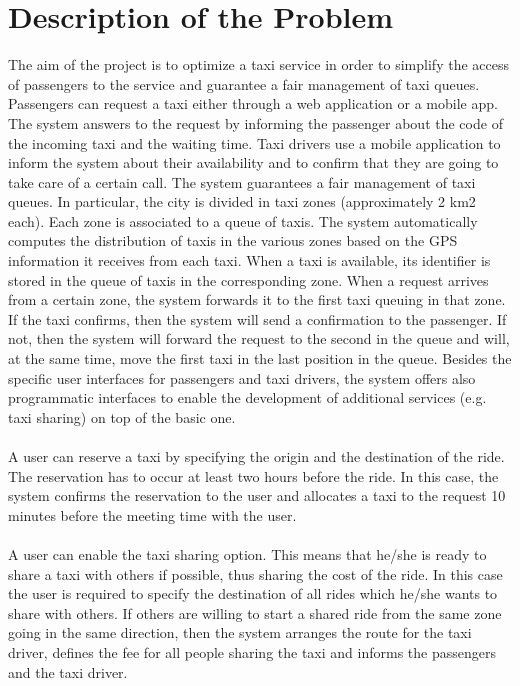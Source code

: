 \section{Description of the Problem}
The aim of the project is to optimize a taxi service in order to simplify the access of passengers to the service and guarantee a fair management of taxi queues. Passengers can request a taxi either through a web application or a mobile app. The system answers to the request by informing the passenger about the code of the incoming taxi and the waiting time. Taxi drivers use a mobile application to inform the system about their availability and to confirm that they are going to take care of a certain call. The system guarantees a fair management of taxi queues. In particular, the city is divided in taxi zones (approximately 2 km2 each). Each zone is associated to a queue of taxis. The system automatically computes the distribution of taxis in the various zones based on the GPS information it receives from each taxi. When a taxi is available, its identifier is stored in the queue of taxis in the corresponding zone. When a request arrives from a certain zone, the system forwards it to the first taxi queuing in that zone. If the taxi confirms, then the system will send a confirmation to the passenger. If not, then the system will forward the request to the second in the queue and will, at the same time, move the first taxi in the last position in the queue.
Besides the specific user interfaces for passengers and taxi drivers, the system offers also programmatic interfaces to enable the development of additional services (e.g. taxi sharing) on top of the basic one.
\\ \\
A user can reserve a taxi by specifying the origin and the destination of the ride. The reservation has to occur at least two hours before the ride. In this case, the system confirms the reservation to the user and allocates a taxi to the request 10 minutes before the meeting time with the user.
\\ \\
A user can enable the taxi sharing option. This means that he/she is ready to share a taxi with others if possible, thus sharing the cost of the ride. In this case the user is required to specify the destination of all rides which he/she wants to share with others. If others are willing to start a shared ride from the same zone going in the same direction, then the system arranges the route for the taxi driver, defines the fee for all people sharing the taxi and informs the passengers and the taxi driver.

